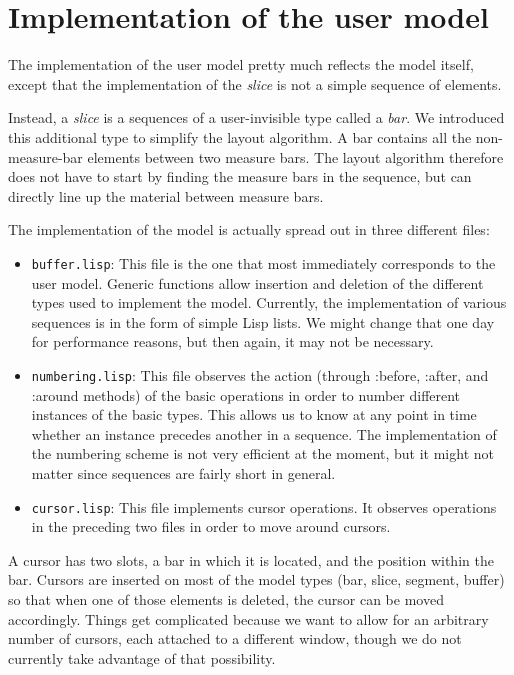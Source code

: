 \documentclass[11pt]{book}
\begin{document}
\chapter{Implementation of the user model}

The implementation of the user model pretty much reflects the model
itself, except that the implementation of the \emph{slice} is not a
simple sequence of elements.

Instead, a \emph{slice} is a sequences of a user-invisible type called
a \emph{bar}.  We introduced this additional type to simplify the
layout algorithm.  A bar contains all the non-measure-bar elements
between two measure bars.  The layout algorithm therefore does not
have to start by finding the measure bars in the sequence, but can
directly line up the material between measure bars.

The implementation of the model is actually spread out in three
different files:

\begin{itemize} 
\item \texttt{buffer.lisp}: This file is the one that most immediately
  corresponds to the user model.  Generic functions allow insertion
  and deletion of the different types used to implement the model.
  Currently, the implementation of various sequences is in the form of
  simple Lisp lists.  We might change that one day for performance
  reasons, but then again, it may not be necessary. 
\item \texttt{numbering.lisp}: This file observes the action (through
  :before, :after, and :around methods) of the basic operations in
  order to number different instances of the basic types.  This allows
  us to know at any point in time whether an instance precedes another
  in a sequence.  The implementation of the numbering scheme is not
  very efficient at the moment, but it might not matter since
  sequences are fairly short in general.
\item \texttt{cursor.lisp}: This file implements cursor operations.
  It observes operations in the preceding two files in order to move
  around cursors.  
\end{itemize}

A cursor has two slots, a bar in which it is located, and the position
within the bar.  Cursors are inserted on most of the model types (bar,
slice, segment, buffer) so that when one of those elements is deleted,
the cursor can be moved accordingly.  Things get complicated because
we want to allow for an arbitrary number of cursors, each attached to
a different window, though we do not currently take advantage of that
possibility.
\end{document}
